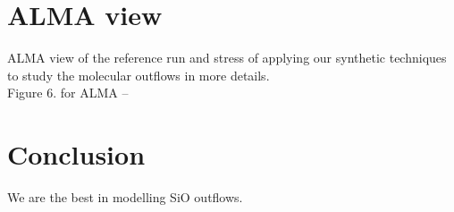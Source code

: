 \documentclass[useAMS,usenatbib,letters]{mn2e}
\begin{document}
\section{ALMA view}
ALMA view of the reference run and stress of applying our synthetic techniques
to study the molecular outflows in more details.\\
Figure 6. for ALMA -- \\


\section{Conclusion}
We are the best in modelling SiO outflows.






\label{lastpage}
\end{document}
